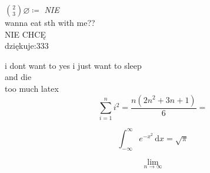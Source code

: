 \documentclass{article}
\begin{document}
\(\binom{2}{3} \varnothing \coloneqq \) 
\emph{NIE}\\
wanna eat sth with me??\\
NIE CHCĘ\\
dziękuje:333

i dont want to 
yes
i just want to sleep\\
and die\\
too much latex\\

\[
    \sum_{i=1}^{n} i^2 = \frac{n (2 n^{2} + 3 n + 1)}{6} =
\]

\[
    \int_{-\infty}^{\infty} e^{-x^2} \,\mathrm{d}x  = \sqrt{\pi}
\]

\[
    \lim\limits_{n \to \infty} 
\]
\end{document}
